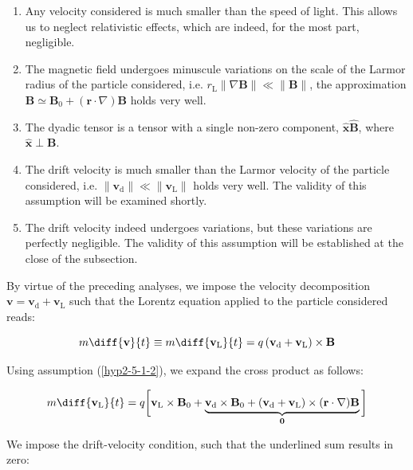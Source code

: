 \begin{enumerate}
    \item\label{hyp2-5-1-1} Any velocity considered is much smaller than the speed of light. This allows us to neglect relativistic effects, which are indeed, for the most part, negligible.
    \item\label{hyp2-5-1-2} The magnetic field undergoes minuscule variations on the scale of the Larmor radius of the particle considered, i.e. $r_\text{L}\|\nabla\mathbf{B}\|\ll\|\mathbf{B}\|$, the approximation $\mathbf{B}\simeq\mathbf{B}_0+(\mathbf{r}\cdot\nabla)\mathbf{B}$ holds very well.
    \item\label{hyp2-5-1-3} The dyadic tensor is a tensor with a single non-zero component, $\mathbf{\hat{x}}\mathbf{\hat{B}}$, where $\mathbf{\hat{x}}\perp\mathbf{B}$.
    \item\label{hyp2-5-1-4} The drift velocity is much smaller than the Larmor velocity of the particle considered, i.e. $\|\mathbf{v}_\mathrm{d}\|\ll\|\mathbf{v}_\text{L}\|$ holds very well. The validity of this assumption will be examined shortly.
    \item\label{hyp2-5-1-5} The drift velocity indeed undergoes variations, but these variations are perfectly negligible. The validity of this assumption will be established at the close of the subsection.
\end{enumerate}

By virtue of the preceding analyses, we impose the velocity decomposition $\mathbf{v}=\mathbf{v}_\mathrm{d}+\mathbf{v}_\text{L}$ such that the Lorentz equation applied to the particle considered reads:

\begin{equation}
    m\diff{\mathbf{v}}{t}\equiv m\diff{\mathbf{v}_\text{L}}{t}=q\left(\mathbf{v}_\mathrm{d}+\mathbf{v}_\text{L}\right)\times\mathbf{B}
\end{equation}

Using assumption (\ref{hyp2-5-1-2}), we expand the cross product as follows:

\begin{equation}
    m\diff{\mathbf{v}_\text{L}}{t}=q\bigg[\mathbf{v}_\text{L}\times\mathbf{B}_0+\underbrace{\mathbf{v}_\mathrm{d}\times\mathbf{B}_0+(\mathbf{v}_\mathrm{d}+\mathbf{v}_\text{L})\times(\mathbf{r}\cdot\nabla)\mathbf{B}}_\mathbf{0}\bigg]
\end{equation}

We impose the drift-velocity condition, such that the underlined sum results in zero:

